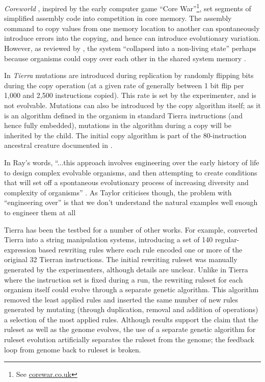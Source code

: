 \emph{Coreworld} \parencite{Rasmussen1990}, inspired by the early computer game ``Core War''\footnote{See \url{corewar.co.uk}}, set segments of simplified assembly code into competition in core memory. The assembly command to copy values from one memory location to another can spontaneously introduce errors into the copying, and hence can introduce evolutionary variation. However, as reviewed by \textcite{Ofria2004}, the system ``collapsed into a non-living state'' perhaps because organisms could copy over each other in the shared system memory \parencite{Ofria2004}.

In \emph{Tierra} \parencite{Ray1991} mutations are introduced during replication by randomly flipping bits during the copy operation (at a given rate of generally between 1 bit flip per 1,000 and 2,500 instructions copied). This rate is set by the experimenter, and is not evolvable. Mutations can also be introduced by the copy algorithm itself; as it is an algorithm defined in the organism in standard Tierra instructions (and hence fully embedded), mutations in the algorithm during a copy will be inherited by the child. The initial copy algorithm is part of the 80-instruction ancestral creature documented in \textcite[app.C]{Ray1991}.

In Ray's words, ``...this approach involves engineering over the early history of life to design complex evolvable organisms, and then attempting to create conditions that will set off a spontaneous evolutionary process of increasing diversity and complexity of organisms'' \parencite[p.3]{Ray1991}. As Taylor criticises though, the problem with ``engineering over'' is that we don't understand the natural examples well enough to engineer them at all \parencite{Taylor2001}

Tierra has been the testbed for a number of other works. For example, \textcite{SugiuraSuzukiShioseEtAl2003} converted Tierra into a string manipulation systems, introducing a set of 140 regular-expression based rewriting rules where each rule encoded one or more of the original 32 Tierran instructions. The initial rewriting ruleset was manually generated by the experimenters, although details are unclear. Unlike in Tierra where the instruction set is fixed during a run, the rewriting ruleset for each organism itself could evolve through a separate genetic algorithm. This algorithm removed the least applied rules and inserted the same number of new rules generated by mutating (through duplication, removal and addition of operations) a selection of the most applied rules. Although results support the claim that the ruleset as well as the genome evolves, the use of a separate genetic algorithm for ruleset evolution artificially separates the ruleset from the genome; the feedback loop from genome back to ruleset is broken.

